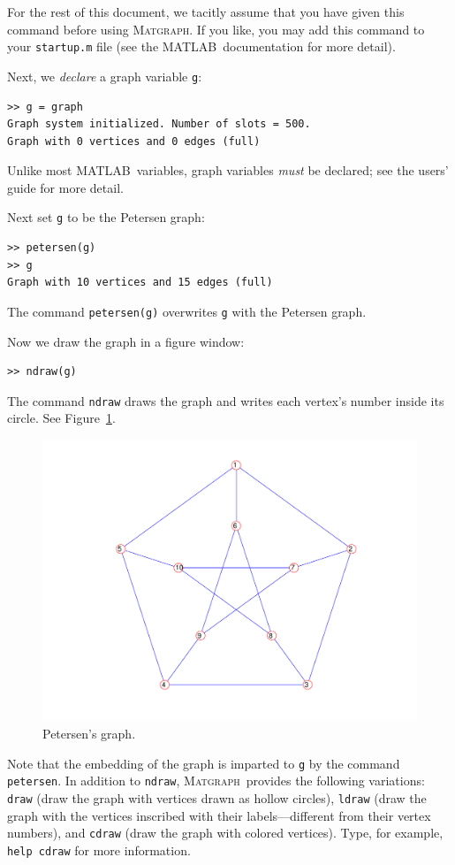 \documentclass[12pt]{amsart}
\newcommand\matlab{MATLAB}
\newcommand\matgraph{\textsc{Matgraph}}
\begin{document}
For the rest of this document, we tacitly assume that you have given
this command before using \matgraph. If you like, you may add this
command to your \verb|startup.m| file (see the \matlab\ documentation
for more detail).

Next, we \emph{declare} a graph variable \verb|g|:
\begin{verbatim}
>> g = graph
Graph system initialized. Number of slots = 500.
Graph with 0 vertices and 0 edges (full)
\end{verbatim}
Unlike most \matlab\ variables, graph variables \emph{must} be
declared; see the users' guide for more detail.

Next set \verb|g| to be the Petersen graph:
\begin{verbatim}
>> petersen(g)
>> g
Graph with 10 vertices and 15 edges (full)
\end{verbatim}
The command \verb|petersen(g)| overwrites \verb|g| with the Petersen
graph. 

Now we draw the graph in a figure window:
\begin{verbatim}
>> ndraw(g)
\end{verbatim}
The command \verb|ndraw| draws the graph and writes each vertex's
number inside its circle. See Figure~\ref{fig:petersen}.
\begin{figure}[ht]
  \begin{center}
    \includegraphics[scale=0.5]{figs/petersen}
  \end{center}
  \caption{Petersen's graph.}
  \label{fig:petersen}
\end{figure}
Note that the embedding of the graph is imparted to \verb|g| by the
command \verb|petersen|. In addition to \verb|ndraw|, \matgraph\ 
provides the following variations: \verb|draw| (draw the graph with
vertices drawn as hollow circles), \verb|ldraw| (draw the graph with
the vertices inscribed with their labels---different from their vertex
numbers), and \verb|cdraw| (draw the graph with colored vertices).
Type, for example, \verb|help cdraw| for more information.
\end{document}
